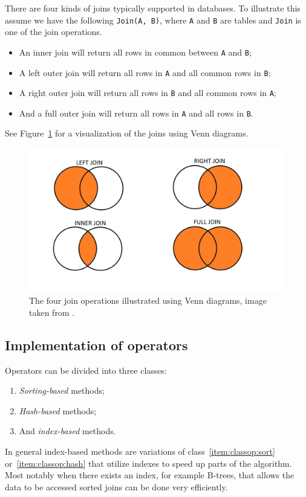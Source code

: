 There are four kinds of joins typically supported in databases. To illustrate
this assume we have the following \texttt{Join(A, B)}, where \texttt{A} and
\texttt{B} are tables and \texttt{Join} is one of the join operations.
\begin{itemize}
    \item An inner join will return all rows in common between \texttt{A} and \texttt{B};
    \item A left outer join will return all rows in \texttt{A} and all common rows in \texttt{B};
    \item A right outer join will return all rows in \texttt{B} and all common rows in \texttt{A};
    \item And a full outer join will return all rows in \texttt{A} and all rows in \texttt{B}.
\end{itemize}
See Figure~\ref{fig:vennjoin} for a visualization of the joins using Venn diagrams.

\begin{figure}[ht]
\includegraphics[scale=0.4]{Images/SQL-Join-Venn-Diagrams.jpg}
\caption[Illustration of join operations using Venn diagrams]{The four join operations illustrated using Venn diagrams, image taken from \cite{brian_2014_better_bqj}.}\label{fig:vennjoin}
\end{figure}

\subsection{Implementation of operators} \label{sec:opimpl}

Operators can be divided into three classes:
\begin{enumerate}
    \item\label{item:classop:sort} \textit{Sorting-based} methods;
    \item\label{item:classop:hash} \textit{Hash-based} methods;
    \item\label{item:classop:index} And \textit{index-based} methods.
\end{enumerate}
In general index-based methods are variations of class~\ref{item:classop:sort}
or~\ref{item:classop:hash} that utilize indexes to speed up parts of the
algorithm. Most notably when there exists an index, for example B-trees, that
allows the data to be accessed sorted joins can be done very efficiently.

